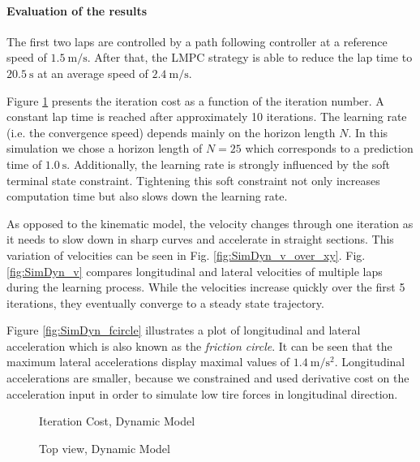 \paragraph{Evaluation of the results}The first two laps are controlled by a path following controller at a reference speed of $\SI{1.5}{\meter\per\second}$. After that, the LMPC strategy is able to reduce the lap time to $\SI{20.5}{\second}$ at an average speed of $\SI{2.4}{\meter\per\second}$.

Figure \ref{fig:SimDyn_cost} presents the iteration cost as a function of the iteration number. A constant lap time is reached after approximately 10 iterations. The learning rate (i.e. the convergence speed) depends mainly on the horizon length $N$. In this simulation we chose a horizon length of $N=25$ which corresponds to a prediction time of $\SI{1.0}{\second}$. Additionally, the learning rate is strongly influenced by the soft terminal state constraint. Tightening this soft constraint not only increases computation time but also slows down the learning rate.

As opposed to the kinematic model, the velocity changes through one iteration as it needs to slow down in sharp curves and accelerate in straight sections. This variation of velocities can be seen in Fig. \ref{fig:SimDyn_v_over_xy}. Fig. \ref{fig:SimDyn_v} compares longitudinal and lateral velocities of multiple laps during the learning process. While the velocities increase quickly over the first 5 iterations, they eventually converge to a steady state trajectory.

Figure \ref{fig:SimDyn_fcircle} illustrates a plot of longitudinal and lateral acceleration which is also known as the \emph{friction circle}. It can be seen that the maximum lateral accelerations display maximal values of $\SI{1.4}{\meter\per\square\second}$. Longitudinal accelerations are smaller, because we constrained and used derivative cost on the acceleration input in order to simulate low tire forces in longitudinal direction.

\begin{figure}[ht]
	\centering
  	
	\caption{Iteration Cost, Dynamic Model}
	\label{fig:SimDyn_cost}
\end{figure}

\begin{figure}[ht]
	\centering
  	
	\caption{Top view, Dynamic Model}
	\label{fig:SimDyn_xy}
\end{figure}

